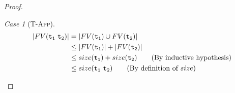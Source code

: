 \documentclass{article}
\newcommand{\term}[1]{\texttt{t\textsubscript{#1}}}
\theoremstyle{remark}
\newtheorem*{case}{Case}
\begin{document}
\begin{proof}
        \begin{case}[\textsc{T-App}]
            \begin{align*}
                |FV(\term{1}\ \term{2})| &= |FV(\term{1}) \cup FV(\term{2})| \\
                                         &\le |FV(\term{1})| + |FV(\term{2})| \\
                                         &\le size(\term{1}) + size(\term{2}) \tag{By inductive hypothesis} \\
                                         &\le size(\term{1}\ \term{2}) \tag{By definition of $size$}
            \end{align*}
        \end{case}
    \end{proof}
\end{document}
